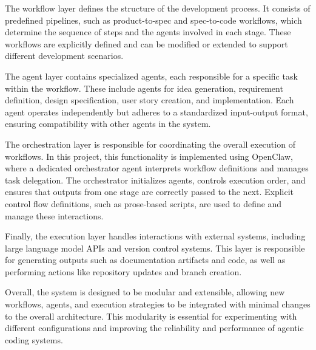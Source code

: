 \documentclass[a4paper,12pt]{report}
\begin{document}
The workflow layer defines the structure of the development process. It consists of predefined pipelines, such as product-to-spec and spec-to-code workflows, which determine the sequence of steps and the agents involved in each stage. These workflows are explicitly defined and can be modified or extended to support different development scenarios.

The agent layer contains specialized agents, each responsible for a specific task within the workflow. These include agents for idea generation, requirement definition, design specification, user story creation, and implementation. Each agent operates independently but adheres to a standardized input-output format, ensuring compatibility with other agents in the system.

The orchestration layer is responsible for coordinating the overall execution of workflows. In this project, this functionality is implemented using OpenClaw, where a dedicated orchestrator agent interprets workflow definitions and manages task delegation. The orchestrator initializes agents, controls execution order, and ensures that outputs from one stage are correctly passed to the next. Explicit control flow definitions, such as prose-based scripts, are used to define and manage these interactions.

Finally, the execution layer handles interactions with external systems, including large language model APIs and version control systems. This layer is responsible for generating outputs such as documentation artifacts and code, as well as performing actions like repository updates and branch creation.

Overall, the system is designed to be modular and extensible, allowing new workflows, agents, and execution strategies to be integrated with minimal changes to the overall architecture. This modularity is essential for experimenting with different configurations and improving the reliability and performance of agentic coding systems.
\end{document}

